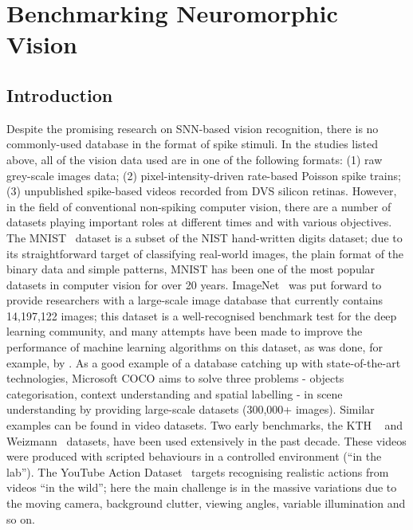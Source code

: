 \chapter{Benchmarking Neuromorphic Vision}
\label{cha:bench}
\section{Introduction}
Despite the promising research on SNN-based vision recognition, there is no commonly-used database in the format of spike stimuli.
In the studies listed above, all of the vision data used are in one of the following formats:
(1) raw grey-scale images data;
(2) pixel-intensity-driven rate-based Poisson spike trains;
(3) unpublished spike-based videos recorded from DVS silicon retinas.
However, in the field of conventional non-spiking computer vision, there are a number of datasets playing important roles at different times and with various objectives.
The MNIST~\cite{lecun1998gradient} dataset is a subset of the NIST hand-written digits dataset; due to its straightforward target of classifying real-world images, the plain format of the binary data and simple patterns, MNIST has been one of the most popular datasets in computer vision for over 20 years.
ImageNet~\cite{deng2009imagenet} was put forward to provide researchers with a large-scale image database that currently contains 14,197,122 images;
this dataset is a well-recognised benchmark test for the deep learning community, and many attempts have been made to improve the performance of machine learning algorithms on this dataset, as was done, for example, by \cite{krizhevsky2012imagenet}.
As a good example of a database catching up with state-of-the-art technologies, Microsoft COCO aims to solve three problems - objects categorisation, context understanding and spatial labelling - in scene understanding by providing large-scale datasets (300,000+ images).
Similar examples can be found in video datasets.
Two early benchmarks, the KTH ~\cite{schuldt2004recognizing} and Weizmann~\cite{blank2005actions} datasets, have been used extensively in the past decade. 
These videos were produced with scripted behaviours in a controlled environment (``in the lab'').
The YouTube Action Dataset~\cite{liu2009recognizing} targets recognising realistic actions from videos ``in the wild'';
here the main challenge is in the massive variations due to the moving camera, background clutter, viewing angles, variable illumination and so on.

